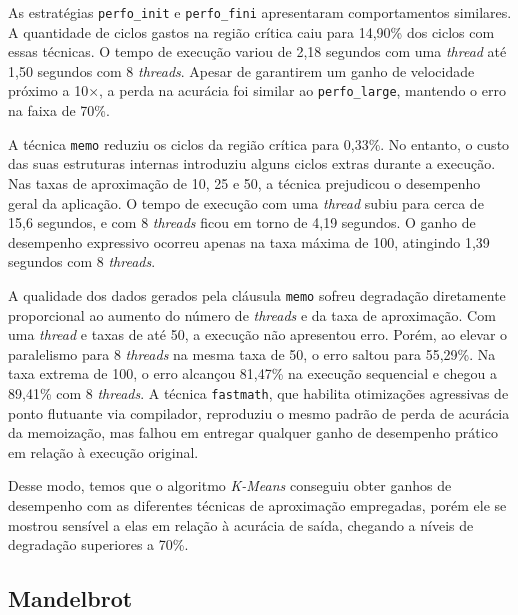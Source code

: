 As estratégias \texttt{perfo\_init} e \texttt{perfo\_fini} apresentaram comportamentos similares. A quantidade de ciclos gastos na região crítica caiu para 14,90\% dos ciclos com essas técnicas. O tempo de execução variou de 2,18 segundos com uma \textit{thread} até 1,50 segundos com 8 \textit{threads}. Apesar de garantirem um ganho de velocidade próximo a 10$\times$, a perda na acurácia foi similar ao \texttt{perfo\_large}, mantendo o erro na faixa de 70\%.

A técnica \texttt{memo} reduziu os ciclos da região crítica para 0,33\%. No entanto, o custo das suas estruturas internas introduziu alguns ciclos extras durante a execução. Nas taxas de aproximação de 10, 25 e 50, a técnica prejudicou o desempenho geral da aplicação. O tempo de execução com uma \textit{thread} subiu para cerca de 15,6 segundos, e com 8 \textit{threads} ficou em torno de 4,19 segundos. O ganho de desempenho expressivo ocorreu apenas na taxa máxima de 100, atingindo 1,39 segundos com 8 \textit{threads}.

A qualidade dos dados gerados pela cláusula \texttt{memo} sofreu degradação diretamente proporcional ao aumento do número de \textit{threads} e da taxa de aproximação. Com uma \textit{thread} e taxas de até 50, a execução não apresentou erro. Porém, ao elevar o paralelismo para 8 \textit{threads} na mesma taxa de 50, o erro saltou para 55,29\%. Na taxa extrema de 100, o erro alcançou 81,47\% na execução sequencial e chegou a 89,41\% com 8 \textit{threads}. A técnica \texttt{fastmath}, que habilita otimizações agressivas de ponto flutuante via compilador, reproduziu o mesmo padrão de perda de acurácia da memoização, mas falhou em entregar qualquer ganho de desempenho prático em relação à execução original.

Desse modo, temos que o algoritmo \textit{K-Means} conseguiu obter ganhos de desempenho com as diferentes técnicas de aproximação empregadas, porém ele se mostrou sensível a elas em relação à acurácia de saída, chegando a níveis de degradação superiores a 70\%.

\subsection{Mandelbrot}\label{subsec:mandelbrot_resultados}

